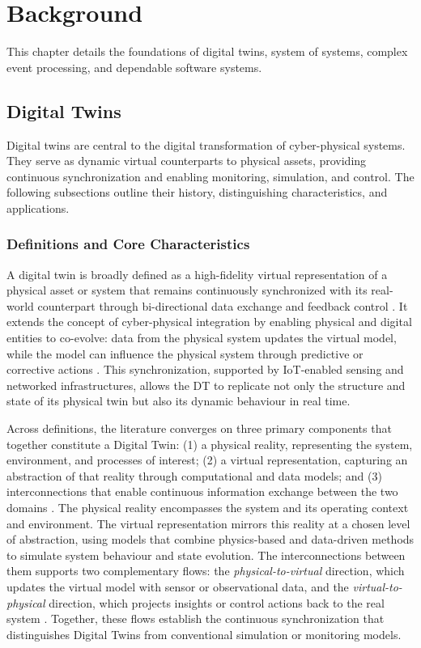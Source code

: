 \chapter{Background}\label{ch:background}
This chapter details the foundations of digital twins, system of systems, complex event processing, and dependable software systems.

\section{Digital Twins}\label{sec:background-dt}
Digital twins are central to the digital transformation of cyber-physical systems. They serve as dynamic virtual counterparts to physical assets, providing continuous synchronization and enabling monitoring, simulation, and control. 
The following subsections outline their history, distinguishing characteristics, and applications.

\subsection{Definitions and Core Characteristics}\label{subsec:background-dt-definitions}
A digital twin is broadly defined as a high-fidelity virtual representation of a physical asset or system that remains continuously synchronized with its real-world counterpart through bi-directional data exchange and feedback control \cite{david2024infonomics}. 
It extends the concept of cyber-physical integration by enabling physical and digital entities to co-evolve: data from the physical system updates the virtual model, while the model can influence the physical system through predictive or corrective actions \cite{tao2018digital}. 
This synchronization, supported by IoT-enabled sensing and networked infrastructures, allows the DT to replicate not only the structure and state of its physical twin but also its dynamic behaviour in real time.

Across definitions, the literature converges on three primary components that together constitute a Digital Twin: 
(1) a physical reality, representing the system, environment, and processes of interest; 
(2) a virtual representation, capturing an abstraction of that reality through computational and data models; and 
(3) interconnections that enable continuous information exchange between the two domains \cite{vanderhorn2021digital}. 
The physical reality encompasses the system and its operating context and environment. The virtual representation mirrors this reality at a chosen level of abstraction, using models that combine physics-based and data-driven methods to simulate system behaviour and state evolution. 
The interconnections between them supports two complementary flows: the \textit{physical-to-virtual} direction, which updates the virtual model with sensor or observational data, and the \textit{virtual-to-physical} direction, which projects insights or control actions back to the real system \cite{vanderhorn2021digital}. 
Together, these flows establish the continuous synchronization that distinguishes Digital Twins from conventional simulation or monitoring models.

